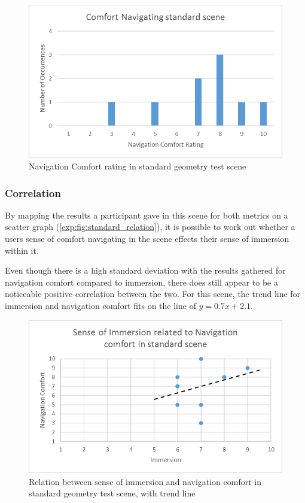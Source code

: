 				\begin{figure}[h]
					\includegraphics[width=1\textwidth]{Images/Standard_Comfort}
					\centering
					\caption{Navigation Comfort rating in standard geometry test scene}
					\label{exp:fig:standard_comfort}
				\end{figure}

			\subsubsection{Correlation}

				By mapping the results a participant gave in this scene for both metrics on a scatter graph (\autoref{exp:fig:standard_relation}), it is possible to work out whether a users sense of comfort navigating in the scene effects their sense of immersion within it.

				Even though there is a high standard deviation with the results gathered for navigation comfort compared to immersion, there does still appear to be a noticeable positive correlation between the two.
				For this scene, the trend line for immersion and navigation comfort fits on the line of $y = 0.7x + 2.1$.

				\begin{figure}[h]
					\includegraphics[width=1\textwidth]{Images/Standard_Relation}
					\centering
					\caption{Relation between sense of immersion and navigation comfort in standard geometry test scene, with trend line}
					\label{exp:fig:standard_relation}
				\end{figure}


